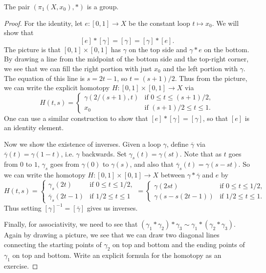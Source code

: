 \begin{lemma}
  The pair $(\pi_1(X, x_0), *)$ is
  a group.
\end{lemma}

\begin{proof}
  For the identity, let $e : [0, 1] \to X$ be the
  constant loop $t \mapsto x_0$. We will show that
  \[
    [e] * [\gamma] = [\gamma] = [\gamma] * [e].
  \]
  The picture is that $[0, 1] \times [0, 1]$ has
  $\gamma$ on the top side and $\gamma * e$ on the
  bottom. By drawing a line from the midpoint of
  the bottom side and the top-right corner, we see
  that we can fill the right portion with just
  $x_0$ and the left portion with $\gamma$.
  The equation of this line is $s = 2t - 1$, so
  $t = (s + 1) / 2$.
  Thus from the picture, we can write the explicit
  homotopy $H : [0, 1] \times [0, 1] \to X$ via
  \[
    H(t, s) =
    \begin{cases}
      \gamma(2 / (s + 1), t) & \text{if } 0 \le t \le (s + 1) / 2, \\
      x_0 & \text{if } (s + 1) / 2 \le t \le 1.
    \end{cases}
  \]
  One can use a similar construction to show that
  $[e] * [\gamma] = [\gamma]$, so that
  $[e]$ is an identity element.

  Now we show the existence of inverses. Given
  a loop $\gamma$, define
  $\overline{\gamma}$ via $\overline{\gamma}(t) = \gamma(1 - t)$, i.e.
  $\gamma$ backwards. Set
  $\gamma_s(t) = \gamma(st)$. Note that
  as $t$ goes from $0$ to $1$, $\gamma_s$ goes
  from $\gamma(0)$ to $\gamma(s)$, and also that
  $\overline{\gamma}_s(t) = \gamma(s - st)$. So
  we can write the homotopy
  $H : [0, 1] \times [0, 1] \to X$ between
  $\gamma * \overline{\gamma}$ and $e$ by
  \[
    H(t, s) =
    \begin{cases}
      \gamma_s(2t) & \text{if } 0 \le t \le 1 / 2, \\
      \overline{\gamma}_s(2t - 1) & \text{if } 1 / 2 \le t \le 1
    \end{cases}
    =
    \begin{cases}
      \gamma(2st) & \text{if } 0 \le t \le 1 / 2, \\
      \gamma(s - s(2t - 1)) & \text{if } 1 / 2 \le t \le 1.
    \end{cases}
  \]
  Thus setting $[\gamma]^{-1} = [\overline{\gamma}]$
  gives us inverses.

  Finally, for associativity, we need to see that
  $(\gamma_1 * \gamma_2) * \gamma_3 \sim \gamma_1 * (\gamma_2 * \gamma_3)$. Again by drawing a picture, we
  see that we can draw two diagonal lines connecting the
  starting points of $\gamma_2$ on top and bottom and
  the ending points of $\gamma_1$ on top and bottom.
  Write an explicit formula for the homotopy
  as an exercise.
\end{proof}

